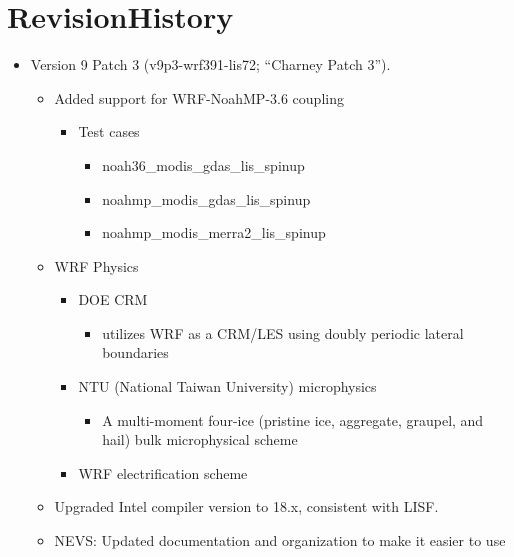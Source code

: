 \section{RevisionHistory}
\label{sec:revhist}

\begin{itemize}
\item Version 9 Patch 3 (v9p3-wrf391-lis72; ``Charney Patch 3''). 
  \begin{itemize}
    \item Added support for WRF-NoahMP-3.6 coupling
    \begin{itemize}
         \item Test cases
         \begin{itemize}
              \item noah36\_modis\_gdas\_lis\_spinup
               \item noahmp\_modis\_gdas\_lis\_spinup
               \item noahmp\_modis\_merra2\_lis\_spinup
           \end{itemize}
        \end{itemize}
  \end{itemize}
  
    \begin{itemize}
    \item WRF Physics
    \begin{itemize}
	\item DOE CRM
         \begin{itemize}
               \item utilizes WRF as a CRM/LES using doubly periodic lateral boundaries
           \end{itemize}
         \item NTU (National Taiwan University) microphysics
         \begin{itemize}
               \item A multi-moment four-ice (pristine ice, aggregate, graupel, and hail) bulk microphysical scheme
           \end{itemize}
         \item WRF electrification scheme
        \end{itemize}
   \item Upgraded Intel compiler version to 18.x, consistent with LISF.
   \item NEVS: Updated documentation and organization to make it easier to use
  \end{itemize}

\end{itemize}

